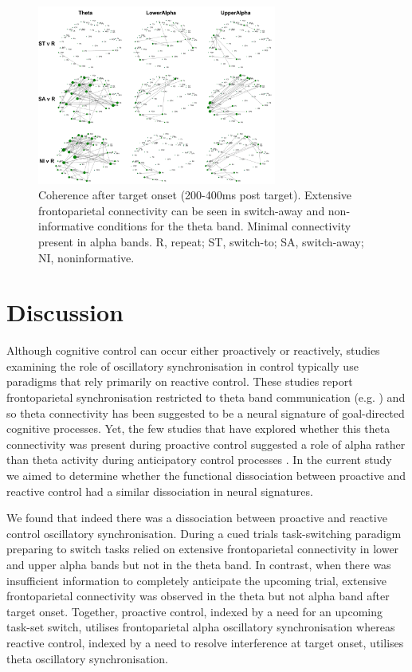 \documentclass[preprint,authoryear,11pt,5p,times,twocolumns]{elsarticle}
\begin{document}
\begin{figure}
\centering
\includegraphics[width = 0.7\textwidth]{1200to1400_connplots.pdf}
\caption{Coherence after target onset (200-400ms post target). Extensive frontoparietal connectivity can be seen in switch-away and non-informative conditions for the theta band. Minimal connectivity present in alpha bands. R, repeat; ST, switch-to; SA, switch-away; NI, noninformative.}
\label{TargetCoherence}
\end{figure}
\section{Discussion}
Although cognitive control can occur either proactively or reactively, studies examining the role of oscillatory synchronisation in control typically use paradigms that rely primarily on reactive control. These studies report frontoparietal synchronisation restricted to theta band communication (e.g. \citealt{Moore2006, Moore2012, SausengTSWT}) and so theta connectivity has been suggested to be a neural signature of goal-directed cognitive processes. Yet, the few studies that have explored whether this theta connectivity was present during proactive control suggested a role of alpha rather than theta activity during anticipatory control processes \citep{Mansfield2012,Serrien}. In the current study we aimed to determine whether the functional dissociation between proactive and reactive control had a similar dissociation in neural signatures. 

We found that indeed there was a dissociation between proactive and reactive control oscillatory synchronisation. During a cued trials task-switching paradigm preparing to switch tasks relied on extensive frontoparietal connectivity in lower and upper alpha bands but not in the theta band. In contrast, when there was insufficient information to completely anticipate the upcoming trial, extensive frontoparietal connectivity was observed in the theta but not alpha band after target onset. Together, proactive control, indexed by a need for an upcoming task-set switch, utilises frontoparietal alpha oscillatory synchronisation whereas reactive control, indexed by a need to resolve interference at target onset, utilises theta oscillatory synchronisation.
\end{document}
